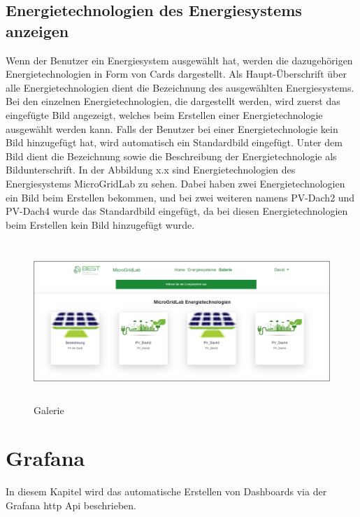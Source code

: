 \newpage
\subsection{Energietechnologien des Energiesystems anzeigen}
Wenn der Benutzer ein Energiesystem ausgewählt hat, werden die dazugehörigen Energietechnologien in Form von Cards dargestellt.
Als Haupt-Überschrift über alle Energietechnologien dient die Bezeichnung des ausgewählten Energiesystems.
Bei den einzelnen Energietechnologien, die dargestellt werden, wird zuerst das eingefügte Bild angezeigt, welches beim Erstellen einer Energietechnologie ausgewählt werden kann. Falls der Benutzer bei einer Energietechnologie kein Bild hinzugefügt hat, wird automatisch ein Standardbild eingefügt. Unter dem Bild dient die Bezeichnung sowie die Beschreibung der Energietechnologie als Bildunterschrift. In der Abbildung x.x sind Energietechnologien des Energiesystems MicroGridLab zu sehen. Dabei haben zwei Energietechnologien ein Bild beim Erstellen bekommen, und bei zwei weiteren namens PV-Dach2 und PV-Dach4 wurde das Standardbild eingefügt, da bei diesen Energietechnologien beim Erstellen kein Bild hinzugefügt wurde.

\begin{figure}[h]
	\centering
	\includegraphics[height=6cm,width=14cm]{images/GalerieET}
	\caption{Galerie}
	\label{fig:Energiesystem auswählen }
\end{figure}


\newpage
\section{Grafana}
In diesem Kapitel wird das automatische Erstellen von Dashboards via der Grafana http Api beschrieben. 

